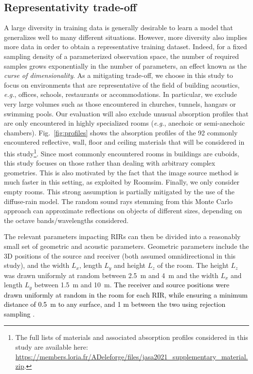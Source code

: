 \documentclass[reprint]{JASA}
\begin{document}
\subsection{Representativity trade-off}
\label{subsec:represent}
A large diversity in training data is generally desirable to learn a model that generalizes well to many different situations. However, more diversity also implies more data in order to obtain a representative training dataset. Indeed, for a fixed sampling density of a parameterized observation space, the number of required samples grows exponentially in the number of parameters, an effect known as the \textit{curse of dimensionality}. As a mitigating trade-off, we choose in this study to focus on environments that are representative of the field of building acoustics, \textit{e.g.}, offices, schools, restaurants or accommodations. In particular, we exclude very large volumes such as those encountered in churches, tunnels, hangars or swimming pools. Our evaluation will also exclude unusual absorption profiles that are only encountered in highly specialized rooms (\textit{e.g.}, anechoic or semi-anechoic chambers). Fig.~\ref{fig:profiles} shows the absorption profiles of the 92 commonly encountered reflective, wall, floor and ceiling materials that will be considered in this study\footnote{The full lists of materials and associated absorption profiles considered in this study are available here: \url{https://members.loria.fr/ADeleforge/files/jasa2021_supplementary_material.zip}.}. Since most commonly encountered rooms in buildings are cuboids, this study focuses on those rather than dealing with arbitrary complex geometries. This is also motivated by the fact that the image source method is much faster in this setting, as exploited by Roomsim. Finally, we only consider empty rooms. This strong assumption is partially mitigated by the use of the diffuse-rain model. The random sound rays stemming from this Monte Carlo approach can approximate reflections on objects of different sizes, depending on the octave bands/wavelengths considered.

The relevant parameters impacting RIRs can then be divided into a reasonably small set of geometric and acoustic parameters. Geometric parameters include the 3D positions of the source and receiver (both assumed omnidirectional in this study), and the width $L_x$, length $L_y$ and height $L_z$ of the room. The height $L_z$ was drawn uniformly at random between 2.5~m and 4~m and the width $L_x$ and length $L_y$ between 1.5~m and 10~m. \textcolor{black}{The receiver and source positions were drawn uniformly at random in the room for each RIR, while ensuring a minimum distance of 0.5~m to any surface, and 1 m between the two using rejection sampling \cite{ISO3382}}.
\end{document}
